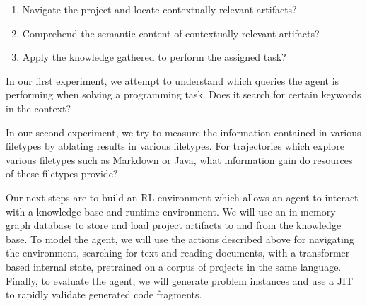 \documentclass[11pt]{article}
\begin{document}
\begin{enumerate}
  \item Navigate the project and locate contextually relevant artifacts?
  \item Comprehend the semantic content of contextually relevant artifacts?
  \item Apply the knowledge gathered to perform the assigned task?
\end{enumerate}

In our first experiment, we attempt to understand which queries the agent is performing when solving a programming task. Does it search for certain keywords in the context?

In our second experiment, we try to measure the information contained in various filetypes by ablating results in various filetypes. For trajectories which explore various filetypes such as Markdown or Java, what information gain do resources of these filetypes provide?

Our next steps are to build an RL environment which allows an agent to interact with a knowledge base and runtime environment. We will use an in-memory graph database to store and load project artifacts to and from the knowledge base. To model the agent, we will use the actions described above for navigating the environment, searching for text and reading documents, with a transformer-based internal state, pretrained on a corpus of projects in the same language. Finally, to evaluate the agent, we will generate problem instances and use a JIT to rapidly validate generated code fragments.

  
  
\end{document}
